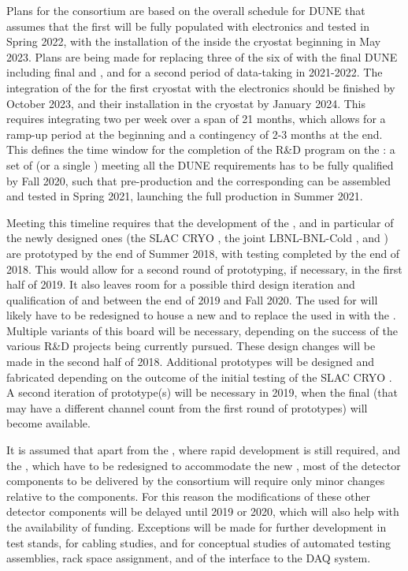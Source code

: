 Plans for the  consortium are based on the overall schedule for DUNE
that assumes that the first  will be fully populated with electronics
and tested in Spring 2022, with the installation of
the  inside the cryostat beginning in May 2023. Plans are being made
for replacing three of the six  of  with the final DUNE 
 including final  and , and for a second period of
data-taking in 2021-2022. The integration of the
 for the first cryostat with the electronics should be finished by
October 2023, and their installation in the cryostat by January 2024.
This requires integrating two  per week over a span of 21 months,
which allows for a ramp-up period at the beginning and a contingency of
2-3 months at the end. This defines the time window for the completion of
the R\&D program on the : a set of  (or a single ) meeting
all the DUNE requirements has to be fully qualified by Fall 2020, such
that pre-production  and the corresponding  can be assembled and
tested in Spring 2021, launching the full production in Summer 2021.

Meeting this timeline requires that the development of the , and in particular
of the newly designed ones (the SLAC CRYO , the joint LBNL-BNL-\fnal Cold ,
and ) are prototyped by the end of Summer 2018, with testing
completed by the end of 2018. This would allow for a second round of prototyping,
if necessary, in the first half of 2019. It also leaves room for a possible
third design iteration and qualification of  and  between the
end of 2019 and Fall 2020. The  used for  will
likely have to be redesigned to house a new  and to replace the  used
in  with the  . Multiple variants of this board will be
necessary, depending on the success of the various  R\&D projects being currently
pursued. These design changes will be made in the second half of 2018.
Additional  prototypes will be designed and fabricated depending on
the outcome of the initial testing of the SLAC CRYO . A second iteration
of  prototype(s) will be necessary in 2019, when the final  (that
may have a different channel count from the first round of prototypes) will become
available. 

It is assumed that apart from the , where rapid development is still
required, and the , which have to be redesigned to accommodate the
new , most of the detector components to be delivered by the  consortium
will require only minor changes relative to the  components. For
this reason the modifications of these other detector components will
be delayed until 2019 or 2020, which will also help with the availability of funding.
Exceptions will be made for further development in test stands, for cabling
studies, and for conceptual studies of automated testing assemblies, rack space
assignment, and of the interface to the DAQ system.

